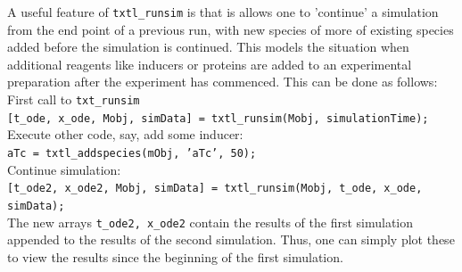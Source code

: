 \documentclass[english]{report}
\begin{document}

\vspace{1\baselineskip}
A useful feature of \texttt{txtl\_runsim} is that is allows one to 'continue' a simulation from the end point of a previous run, with new species of more of existing species added before the simulation is continued. This models the situation when additional reagents like inducers or proteins are added to an experimental preparation after the experiment has commenced. This can be done as follows: \\

First call to \texttt{txt\_runsim} \\
\texttt{[t\_ode, x\_ode, Mobj, simData] = txtl\_runsim(Mobj, simulationTime);} \\

Execute other code, say, add some inducer: \\
\texttt{aTc = txtl\_addspecies(mObj, 'aTc', 50);}\\

Continue simulation:\\
\texttt{[t\_ode2, x\_ode2, Mobj, simData] = txtl\_runsim(Mobj, t\_ode, x\_ode, simData);} \\

The new arrays \texttt{t\_ode2, x\_ode2} contain the results of the first simulation appended to the results of the second simulation. Thus, one can simply plot these to view the results since the beginning of the first simulation. 
\end{document}
